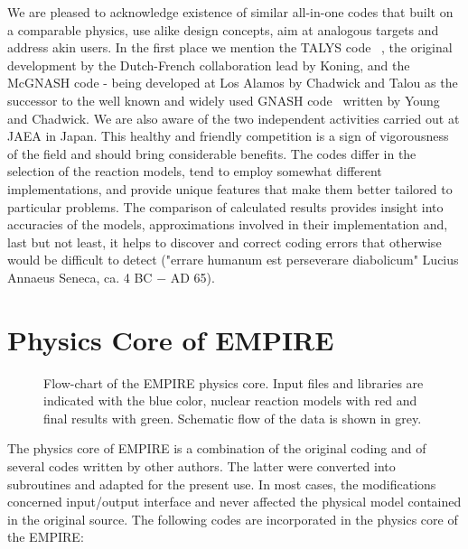 We are pleased to acknowledge existence of similar all-in-one codes that
built on a comparable physics, use alike design concepts, aim at analogous
targets and address akin users. In the first place we mention the TALYS code~%
\cite{TALYS}, the original development by the Dutch-French collaboration
lead by Koning, and the McGNASH code - being developed at Los Alamos by
Chadwick and Talou as the successor to the well known and widely used GNASH
code~\cite{Young:77, Young:92, Young:98} written by Young and Chadwick. We
are also aware of the two independent activities carried out at JAEA in
Japan. This healthy and friendly competition is a sign of vigorousness of
the field and should bring considerable benefits. The codes differ in the
selection of the reaction models, tend to employ somewhat different
implementations, and provide unique features that make them better tailored
to particular problems. The comparison of calculated results provides
insight into accuracies of the models, approximations involved in their
implementation and, last but not least, it helps to discover and correct
coding errors that otherwise would be difficult to detect ("errare humanum
est perseverare diabolicum" Lucius Annaeus Seneca, ca. 4 BC $-$ AD 65).

\section{Physics Core of EMPIRE}

\begin{figure*}[htbp]
\caption{Flow-chart of the EMPIRE physics core. Input files and libraries
are indicated with the blue color, nuclear reaction models with red and
final results with green. Schematic flow of the data is shown in grey.}
\label{fig:physics-core}
\end{figure*}

The physics core of EMPIRE is a combination of the original coding and of
several codes written by other authors. The latter were converted into
subroutines and adapted for the present use. In most cases, the
modifications concerned input/output interface and never affected the
physical model contained in the original source. The following codes are
incorporated in the physics core of the EMPIRE:

